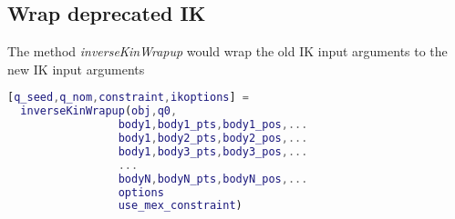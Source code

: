 \documentclass{article}
\begin{document}
\subsection{Wrap deprecated IK}
The method \textsl{inverseKinWrapup} would wrap the old IK input arguments to the new IK input arguments
\begin{lstlisting}[language=MATLAB]
[q_seed,q_nom,constraint,ikoptions] =
  inverseKinWrapup(obj,q0,
                 body1,body1_pts,body1_pos,...
                 body1,body2_pts,body2_pos,...
                 body1,body3_pts,body3_pos,...
                 ...
                 bodyN,bodyN_pts,bodyN_pos,...
                 options
                 use_mex_constraint)
\end{lstlisting}
\end{document}
